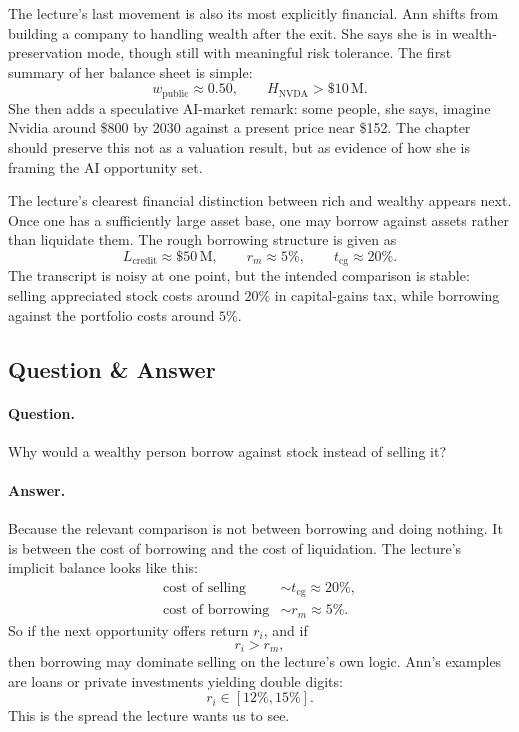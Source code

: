 The lecture's last movement is also its most explicitly financial. Ann shifts from building a company to handling wealth after the exit. She says she is in wealth-preservation mode, though still with meaningful risk tolerance. The first summary of her balance sheet is simple:
\begin{equation}
w_{\mathrm{public}} \approx 0.50,
\qquad
H_{\mathrm{NVDA}} > \$10\,\mathrm{M}.
\end{equation}
She then adds a speculative AI-market remark: some people, she says, imagine Nvidia around \$800 by 2030 against a present price near \$152. The chapter should preserve this not as a valuation result, but as evidence of how she is framing the AI opportunity set.

The lecture's clearest financial distinction between rich and wealthy appears next. Once one has a sufficiently large asset base, one may borrow against assets rather than liquidate them. The rough borrowing structure is given as
\begin{equation}
L_{\mathrm{credit}} \approx \$50\,\mathrm{M},
\qquad
r_m \approx 5\%,
\qquad
t_{\mathrm{cg}} \approx 20\%.
\end{equation}
The transcript is noisy at one point, but the intended comparison is stable: selling appreciated stock costs around \(20\%\) in capital-gains tax, while borrowing against the portfolio costs around \(5\%\).

\subsection{Question \& Answer}

\paragraph{Question.} Why would a wealthy person borrow against stock instead of selling it?

\paragraph{Answer.} Because the relevant comparison is not between borrowing and doing nothing. It is between the cost of borrowing and the cost of liquidation. The lecture's implicit balance looks like this:
\begin{align}
\text{cost of selling} &\sim t_{\mathrm{cg}} \approx 20\%,\\
\text{cost of borrowing} &\sim r_m \approx 5\%.
\end{align}
So if the next opportunity offers return \(r_i\), and if
\begin{equation}
r_i > r_m,
\end{equation}
then borrowing may dominate selling on the lecture's own logic. Ann's examples are loans or private investments yielding double digits:
\begin{equation}
r_i \in [12\%,15\%].
\end{equation}
This is the spread the lecture wants us to see.

